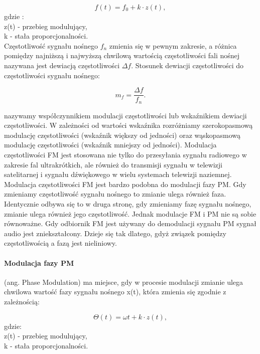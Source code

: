 \documentclass[a4paper,twoside]{report}
\begin{document}
\begin{equation}
f(t)=f_0+k\cdot z(t),
\end{equation}
gdzie : \\
z(t) - przebieg modulujący,\\
k - stała proporcjonalności.\\

Częstotliwość sygnału nośnego $f_n$ zmienia się w pewnym zakresie, a różnica pomiędzy najniższą i najwyższą chwilową wartością częstotliwości fali nośnej nazywana jest dewiacją częstotliwości $\Delta f$. Stosunek dewiacji częstotliwości do częstotliwości sygnału nośnego:

\begin{equation}
 m_f=\dfrac{\Delta f}{f_n}. 
\end{equation}

nazywamy współczynnikiem modulacji częstotliwości lub wskaźnikiem dewiacji częstotliwości. W zależności od wartości wskaźnika rozróżniamy szerokopasmową modulację częstotliwości (wskaźnik większy od jedności) oraz wąskopasmową modulację częstotliwości (wskaźnik mniejszy od jedności). Modulacja częstotliwości FM jest stosowana nie tylko do przesyłania sygnału radiowego w zakresie fal ultrakrótkich, ale również do transmisji sygnału w telewizji satelitarnej i sygnału dźwiękowego w wielu systemach telewizji naziemnej. Modulacja częstotliwości FM jest bardzo podobna do modulacji fazy PM. Gdy zmieniamy częstotliwość sygnału nośnego to zmianie ulega również faza. Identycznie odbywa się to w druga stronę, gdy zmieniamy fazę sygnału nośnego, zmianie ulega również jego częstotliwość. Jednak modulacje FM i PM nie są sobie równoważne. Gdy odbiornik FM jest używany do demodulacji sygnału PM sygnał audio jest zniekształcony. Dzieje się tak dlatego, gdyż związek pomiędzy częstotliwością a fazą jest nieliniowy. 

\paragraph{Modulacja fazy PM} (ang. Phase Modulation) ma miejsce, gdy w procesie modulacji zmianie ulega chwilowa wartość fazy sygnału nośnego x(t), która zmienia się zgodnie z zależnością:

\begin{equation}
\Theta (t)=\omega t+k\cdot z(t),
\end{equation}
gdzie: \\
z(t) - przebieg modulujący,\\
k - stała proporcjonalności. \\
\end{document}
